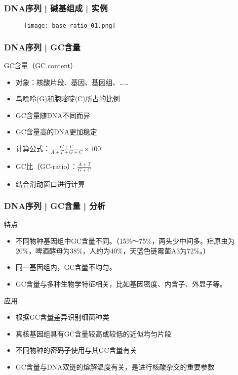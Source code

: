 \begin{frame}
  \frametitle{DNA序列 | 碱基组成 | 实例}
  \begin{figure}
    \centering
    \texttt{[image: base\_ratio\_01.png]}
  \end{figure}
\end{frame}

\begin{frame}
  \frametitle{DNA序列 | GC含量}
  \begin{block}{GC含量（GC content）}
    \begin{itemize}
      \item 对象：核酸片段、基因、基因组、……
      \item 鸟嘌呤(G)和胞嘧啶(C)所占的比例
      \item GC含量随DNA不同而异
      \item GC含量高的DNA更加稳定
      \item 计算公式：$\frac{G+C}{A+T+G+C}\times100$
      \item GC比（GC-ratio）：$\frac{A+T}{G+C}$
      \item 结合滑动窗口进行计算
    \end{itemize}
  \end{block}
\end{frame}

\begin{frame}
  \frametitle{DNA序列 | GC含量 | 分析}
  \begin{block}{特点}
  \begin{itemize}
    \item 不同物种基因组中GC含量不同。（15\%～75\%，两头少中间多。疟原虫为20\%，啤酒酵母为38\%，人约为40\%，天蓝色链霉菌A3为72\%。）
    \item 同一基因组内，GC含量不均匀。
    \item GC含量与多种生物学特征相关，比如基因密度、内含子、外显子等。
  \end{itemize}
\end{block}
\pause
\begin{block}{应用}
  \begin{itemize}
    \item 根据GC含量差异识别细菌种类
    \item 真核基因组具有GC含量较高或较低的近似均匀片段
    \item 不同物种的密码子使用与其GC含量有关 
    \item GC含量与DNA双链的熔解温度有关，是进行核酸杂交的重要参数
  \end{itemize}
\end{block}
\end{frame}

